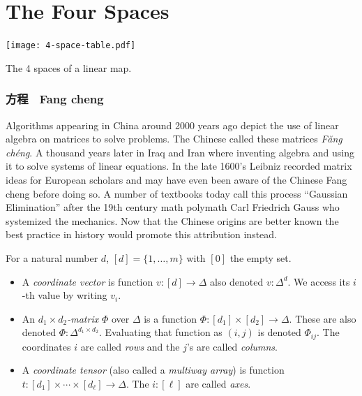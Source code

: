 \documentclass[12pt,twoside,dvipsnames,letterpaper]{memoir}
\author{James B. Wilson}
\date{\today}
\begin{document}
\chapter{The Four Spaces}


\begin{table}[!htbp]
    \centering
    \texttt{[image: 4-space-table.pdf]}
    \caption{The 4 spaces of a linear map.}
    \label{tab:4-spaces}
\end{table}
\begin{CJK*}{UTF8}{gbsn}

\subsection{ 方程 ~Fang cheng}
\end{CJK*}
Algorithms appearing in China around 2000 years
ago depict the use of linear algebra on matrices 
to solve problems.  The Chinese called these matrices 
\emph{F\u{a}ng} \emph{ch\'eng}.
A thousand years later in Iraq and Iran where inventing algebra
and using it to solve systems of linear equations.
In the late 1600's Leibniz recorded matrix ideas for European 
scholars and may have even been aware of the Chinese Fang cheng
before doing so.  
A number of textbooks today call this process
``Gaussian Elimination'' after the 19th century math polymath 
Carl Friedrich Gauss who systemized the mechanics.  
Now that the Chinese origins are better known the best 
practice in history would promote this attribution instead.


\begin{definition}
    For a natural number $d$, $[d]=\{1,\ldots,m\}$ with $[0]$
    the empty set.
    \begin{itemize}
        \item
    A \emph{coordinate vector} is function $v:[d]\to \Delta$
    also denoted $v:\Delta^d$.  We access its $i$-th value by 
    writing $v_i$.

    \item 
    An \emph{$d_1\times d_2$-matrix} $\Phi$ over $\Delta$
    is a function $\Phi:[d_1]\times [d_2]\to \Delta$.
    These are also denoted $\Phi:\Delta^{d_1\times d_2}$.
    Evaluating that function as $(i,j)$ is denoted 
    $\Phi_{ij}$.  The coordinates $i$ are called \emph{rows}
    and the $j$'s are called \emph{columns}.

    \item A \emph{coordinate tensor} (also called a \emph{multiway array})
     is function 
    $t:[d_1]\times \cdots\times [d_{\ell}]\to \Delta$.
    The $i:[\ell]$ are called \emph{axes}.
    \end{itemize}
\end{definition}
\end{document}
